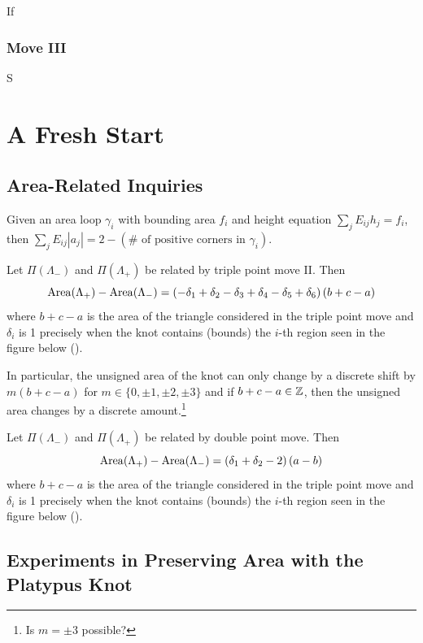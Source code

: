 \documentclass[11pt,oneside]{amsart}
\begin{document}
If 


\subsubsection{Move III}

S


\section{A Fresh Start}

\subsection{Area-Related Inquiries}

\begin{lemma}[Chekanov]
    Given an area loop $\gamma_i$ with bounding area $f_i$ and height equation $\sum_j E_{ij}h_j=f_i$, then $\sum_j E_{ij}|a_j|=2-(\# \text{ of positive corners in } \gamma_i)$.
\end{lemma}

\begin{lemma}[Us]
    Let $\Pi(\Lambda_-)$ and $\Pi(\Lambda_+)$ be related by triple point move II. Then 
        \[\operatorname{Area}(\Lambda_+)-\operatorname{Area}(\Lambda_-)=\left(-\delta_1 + \delta_2 -\delta_3 + \delta_4 - \delta_5 +\delta_6\right)(b+c-a)\]
    where $b+c-a$ is the area of the triangle considered in the triple point move and $\delta_i$ is 1 precisely when the knot contains (bounds) the $i$-th region seen in the figure below (\TODO).
\end{lemma}
In particular, the unsigned area of the knot can only change by a discrete shift by $m(b+c-a)$ for $m\in\{0,\pm1,\pm2,\pm3\}$ and if $b+c-a\in \mathbb Z$, then the unsigned area changes by a discrete amount.\footnote{Is $m=\pm3$ possible?}

\begin{lemma}[Us]
    Let $\Pi(\Lambda_-)$ and $\Pi(\Lambda_+)$ be related by double point move. Then 
        \[\operatorname{Area}(\Lambda_+)-\operatorname{Area}(\Lambda_-)=\left(\delta_1 + \delta_2 -2\right)(a-b)\]
    where $b+c-a$ is the area of the triangle considered in the triple point move and $\delta_i$ is 1 precisely when the knot contains (bounds) the $i$-th region seen in the figure below (\TODO).
\end{lemma}


\subsection{Experiments in Preserving Area with the Platypus Knot}
\end{document}
